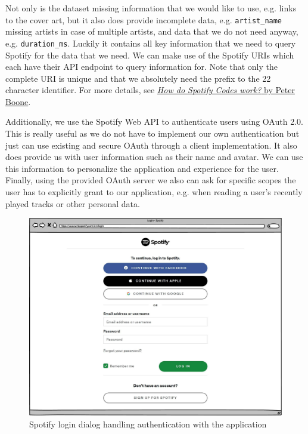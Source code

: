 Not only is the dataset missing information that we would like to use, e.g. links to the cover art, but it also does provide incomplete data, e.g. \texttt{artist\_name} missing artists in case of multiple artists, and data that we do not need anyway, e.g. \texttt{duration\_ms}. Luckily it contains all key information that we need to query Spotify for the data that we need. We can make use of the Spotify URIs which each have their API endpoint to query information for. Note that only the complete \ac{URI} is unique and that we absolutely need the prefix to the 22 character identifier. For more details, see \href{https://boonepeter.github.io/posts/2020-11-10-spotify-codes/}{\textit{How do Spotify Codes work?} by Peter Boone}.

Additionally, we use the Spotify Web API to authenticate users using OAuth 2.0. This is really useful as we do not have to implement our own authentication but just can use existing and secure OAuth through a client implementation. It also does provide us with user information such as their name and avatar. We can use this information to personalize the application and experience for the user. Finally, using the provided OAuth server we also can ask for specific scopes the user has to explicitly grant to our application, e.g. when reading a user's recently played tracks or other personal data.

\begin{figure}[bth]
    \centering
    \includegraphics[width=1.0\textwidth]{Graphics/Chapter2/spotify-login.pdf}
    \caption{Spotify login dialog handling authentication with the application}
    \label{fig:SpotifyLogin}
\end{figure}

